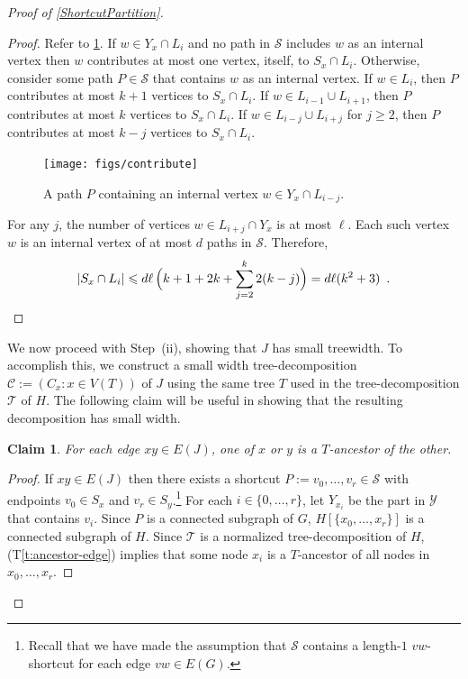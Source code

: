 \documentclass{patmorin}
\theoremstyle{plain}
\newtheorem{clm}{Claim}
\theoremstyle{definition}
\newcommand{\tref}[1]{(T\ref{t:#1})}
\renewcommand{\SS}{\mathcal{S}}
\renewcommand{\ge}{\geqslant}
\renewcommand{\le}{\leqslant}
\begin{document}
\begin{proof}[Proof of \cref{ShortcutPartition}]
\begin{proof}
  Refer to \cref{contribute}.  If $w\in Y_x\cap L_i$ and no path in $\SS$ includes $w$ as an internal vertex then $w$ contributes at most one vertex, itself, to $S_x\cap L_i$.  Otherwise, consider some path $P\in\SS$ that contains $w$ as an internal vertex.  If $w\in L_{i}$, then $P$ contributes at most $k+1$ vertices to $S_x\cap L_i$.  If $w\in L_{i-1}\cup L_{i+1}$, then $P$ contributes at most $k$ vertices to $S_x\cap L_i$. If $w\in L_{i-j}\cup L_{i+j}$ for $j\ge 2$, then $P$ contributes at most $k-j$ vertices to $S_x\cap L_i$.

  \begin{figure}[htbp]
    \begin{center}
      \texttt{[image: figs/contribute]}
    \end{center}
    \caption{A path $P$ containing an internal vertex $w\in Y_x\cap L_{i-j}$.}
    \label{contribute}
  \end{figure}


  For any $j$, the number of vertices $w\in L_{i+j}\cap Y_x$ is at most $\ell$. Each such vertex $w$ is an internal vertex of at most $d$ paths in $\SS$. Therefore,
  \[  |S_x\cap L_i|\le d\ell  \, \Big(k+1 + 2k + \sum_{j=2}^k 2(k-j)\Big)
      = d\ell(k^2 +3) \enspace . \qedhere
  \]
\end{proof}

We now proceed with Step~(ii), showing that $J$ has small treewidth. To accomplish this, we construct a small width tree-decomposition $\mathcal{C}:=(C_x:x\in V(T))$ of $J$ using the same tree $T$ used in the tree-decomposition $\mathcal{T}$ of $H$.  The following claim will be useful in showing that the resulting decomposition has small width.

\begin{clm}\label{i-ancestor}
  For each edge $xy\in E(J)$, one of $x$ or $y$ is a $T$-ancestor of the other.
\end{clm}

\begin{proof}
  If $xy\in E(J)$ then there exists a shortcut $P:=v_0,\ldots,v_r\in\SS$ with endpoints $v_0\in S_x$ and $v_r\in S_y$.\footnote{Recall that we have made the assumption that $\SS$ contains a length-$1$ $vw$-shortcut for each edge $vw\in E(G)$.}  For each $i\in\{0,\ldots,r\}$, let $Y_{x_i}$ be the part in $\mathcal{Y}$ that contains $v_i$.  Since $P$ is a connected subgraph of $G$, $H[\{x_0,\ldots,x_r\}]$ is a connected subgraph of $H$.  Since $\mathcal{T}$ is a normalized tree-decomposition of $H$, \tref{ancestor-edge} implies that some node $x_i$ is a $T$-ancestor of all nodes in $x_0,\ldots,x_r$.


\end{proof}
\end{proof}
\end{document}
